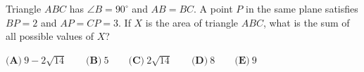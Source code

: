 Triangle $ABC$ has $\angle B=90^\circ$ and $AB=BC$. A point $P$ in the same plane satisfies $BP=2$ and $AP=CP=3$. If $X$ is the area of triangle $ABC$, what is the sum of all possible values of $X$?

$\textbf{(A)}\ 9-2\sqrt{14}\qquad\textbf{(B)}\ 5\qquad\textbf{(C)}\ 2\sqrt{14}\qquad\textbf{(D)}\ 8\qquad\textbf{(E)}\ 9$
